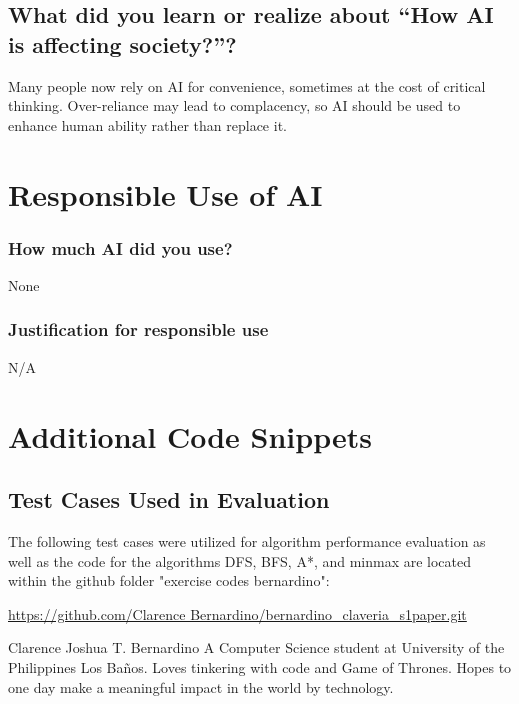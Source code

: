 \documentclass[journal]{./IEEE/IEEEtran}
\begin{document}
\subsection{What did you learn or realize about “How AI is affecting society?”?}
Many people now rely on AI for convenience, sometimes at the cost of critical thinking. Over-reliance 
may lead to complacency, so AI should be used to enhance human ability rather than replace it.  

\section{Responsible Use of AI}

\subsubsection{How much AI did you use? }
None
\subsubsection{Justification for responsible use}
N/A
\appendix

\section{Additional Code Snippets}
\subsection{Test Cases Used in Evaluation}
The following test cases were utilized for algorithm performance evaluation as well as the code for the algorithms DFS, BFS, A*, and minmax are located within the github folder "exercise codes bernardino":

\url{https://github.com/Clarence Bernardino/bernardino_claveria_s1paper.git}





\begin{biography}{Clarence Joshua T. Bernardino} A Computer Science student at University of the Philippines Los Baños. Loves tinkering with code and Game of Thrones. Hopes to one day make a meaningful impact in the world by technology. 
\end{biography}

\end{document}
